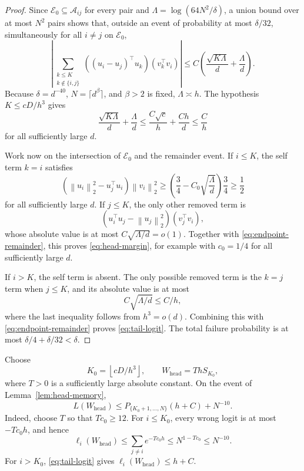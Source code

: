 \documentclass[11pt]{article}
\theoremstyle{remark}
\newcommand{\norm}[1]{\left\lVert #1\right\rVert}
\newcommand{\1}{\mathbf 1}
\begin{document}
\begin{proof}
Since $\mathcal E_0\subseteq\mathcal A_{ij}$ for every pair and
$\Lambda=\log(64N^2/\delta)$, a union bound over at most $N^2$ pairs
shows that, outside an event of probability at most $\delta/32$,
simultaneously for all $i\neq j$ on $\mathcal E_0$,
\begin{equation}
 \left|
 \sum_{\substack{k\leq K\\k\notin\{i,j\}}}
 ((u_i-u_j)^\top u_k)(v_k^\top v_i)
 \right|
 \leq C\left(\frac{\sqrt{K\Lambda}}d+\frac{\Lambda}{d}\right).
 \label{eq:endpoint-remainder}
\end{equation}
Because $\delta=d^{-40}$, $N=\lceil d^\beta\rceil$, and $\beta>2$
is fixed, $\Lambda\asymp h$.  The hypothesis $K\leq cD/h^3$ gives
\[
 \frac{\sqrt{K\Lambda}}d+\frac{\Lambda}{d}
 \leq\frac{C\sqrt c}{h}+\frac{Ch}{d}
 \leq\frac Ch
\]
for all sufficiently large $d$.

Work now on the intersection of $\mathcal E_0$ and the remainder
event.  If $i\leq K$, the self term $k=i$ satisfies
\[
 (\norm{u_i}_2^2-u_j^\top u_i)\norm{v_i}_2^2
 \geq
 \left(\frac34-C_0\sqrt{\frac{\Lambda}{d}}\right)\frac34
 \geq\frac12
\]
for all sufficiently large $d$.  If $j\leq K$, the only other removed
term is
\[
 (u_i^\top u_j-\norm{u_j}_2^2)(v_j^\top v_i),
\]
whose absolute value is at most
$C\sqrt{\Lambda/d}=o(1)$.  Together with
\eqref{eq:endpoint-remainder}, this proves \eqref{eq:head-margin}, for
example with $c_0=1/4$ for all sufficiently large $d$.

If $i>K$, the self term is absent.  The only possible removed term is
the $k=j$ term when $j\leq K$, and its absolute value is at most
\[
 C\sqrt{\Lambda/d}\leq C/h,
\]
where the last inequality follows from $h^3=o(d)$.  Combining this
with \eqref{eq:endpoint-remainder} proves \eqref{eq:tail-logit}.  The
total failure probability is at most
$\delta/4+\delta/32<\delta$.
\end{proof}

Choose
\begin{equation}
 K_0=\left\lfloor cD/h^3\right\rfloor,
 \qquad
 W_{\mathrm{head}}=ThS_{K_0},
 \label{eq:head-comparator}
\end{equation}
where $T>0$ is a sufficiently large absolute constant.  On the event
of Lemma~\ref{lem:head-memory},
\begin{equation}
 L(W_{\mathrm{head}})
 \leq P_{\{K_0+1,\ldots,N\}}(h+C)+N^{-10}.
 \label{eq:head-comparator-loss}
\end{equation}
Indeed, choose $T$ so that $Tc_0\geq12$.  For $i\leq K_0$, every
wrong logit is at most $-Tc_0h$, and hence
\[
 \ell_i(W_{\mathrm{head}})
 \leq\sum_{j\neq i}e^{-Tc_0h}
 \leq N^{1-Tc_0}\leq N^{-10}.
\]
For $i>K_0$, \eqref{eq:tail-logit} gives
$\ell_i(W_{\mathrm{head}})\leq h+C$.
\end{document}
